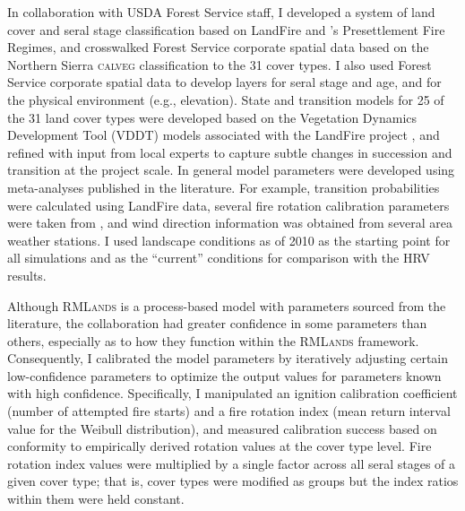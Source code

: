 

In collaboration with USDA Forest Service staff, I developed a system of land cover and seral stage classification based on LandFire \citep{Landfire2007} and \citet{VandeWater2011}'s Presettlement Fire Regimes, and crosswalked Forest Service corporate spatial data based on the Northern Sierra \textsc{calveg} classification \citep{USDAForestService2008,USDAForestService2009} to the 31 cover types. I also used Forest Service corporate spatial data to develop layers for seral stage and age, and for the physical environment (e.g., elevation). State and transition models for 25 of the 31 land cover types were developed based on the Vegetation Dynamics Development Tool (VDDT) models associated with the LandFire project \citep{Landfire2007}, and refined with input from local experts to capture subtle changes in succession and transition at the project scale. In general model parameters were developed using meta-analyses published in the literature. For example, transition probabilities were calculated using LandFire data, several fire rotation calibration parameters were taken from \citet{Mallek2013}, and wind direction information was obtained from several area weather stations. I used landscape conditions as of 2010 as the starting point for all simulations and as the ``current'' conditions for comparison with the HRV results.

Although \textsc{RMLands} is a process-based model with parameters sourced from the literature, the collaboration had greater confidence in some parameters than others, especially as to how they function within the \textsc{RMLands} framework. Consequently, I calibrated the model parameters by iteratively adjusting certain low-confidence parameters to optimize the output values for parameters known with high confidence. Specifically, I manipulated an ignition calibration coefficient (number of attempted fire starts) and a fire rotation index (mean return interval value for the Weibull distribution), and measured calibration success based on conformity to empirically derived rotation values at the cover type level. Fire rotation index values were multiplied by a single factor across all seral stages of a given cover type; that is, cover types were modified as groups but the index ratios within them were held constant.


